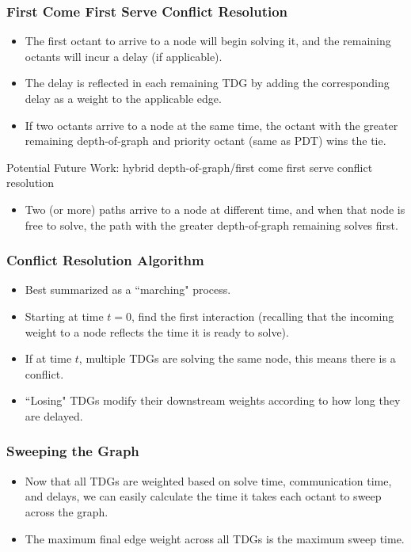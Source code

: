 \documentclass[xcolor={usenames,dvipsnames,svgnames,table}]{beamer}
\begin{document}
\begin{frame}[t]\frametitle{First Come First Serve Conflict Resolution}
\begin{block}{}
\begin{itemize}
	\item The first octant to arrive to a node will begin solving it, and the remaining octants will incur a delay (if applicable).
	\item The delay is reflected in each remaining TDG by adding the corresponding delay as a weight to the applicable edge.
  \item If two octants arrive to a node at the same time, the octant with the greater remaining depth-of-graph and priority octant (same as PDT) wins the tie.
\end{itemize}
\end{block}
\begin{block}{Potential Future Work: hybrid depth-of-graph/first come first serve conflict resolution}
\begin{itemize}
	\item Two (or more) paths arrive to a node at different time, and when that node is free to solve, the path with the greater depth-of-graph remaining solves first.
\end{itemize}
\end{block}
\end{frame}

\begin{frame}[t]\frametitle{Conflict Resolution Algorithm}
  \begin{block}{}
    \begin{itemize}
      \item Best summarized as a ``marching" process. 
      \item Starting at time $t=0$, find the first interaction (recalling that the incoming weight to a node reflects the time it is ready to solve).
      \item If at time $t$, multiple TDGs are solving the same node, this means there is a conflict. 
      \item  ``Losing" TDGs modify their downstream weights according to how long they are delayed.
    \end{itemize}
  \end{block}
\end{frame}

\begin{frame}[t]\frametitle{Sweeping the Graph}
\begin{block}{}
\begin{itemize}
	\item Now that all TDGs are weighted based on solve time, communication time, and delays, we can easily calculate the time it takes each octant to sweep across the graph. 
	\item The maximum final edge weight across all TDGs is the maximum sweep time.
\end{itemize}
\end{block}
\end{frame}
\end{document}
